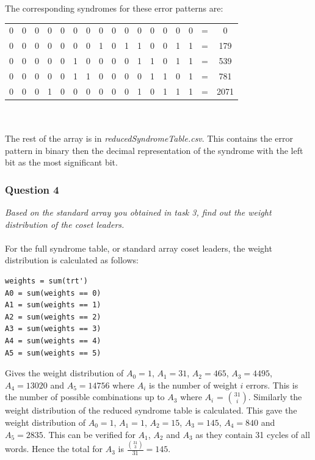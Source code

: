 \documentclass[a4paper]{article}
\begin{document}
The corresponding syndromes for these error patterns are:\\
\begin{tabular}{| *{15}{c} | c c |}
\hline
0 & 0 & 0 & 0 & 0 & 0 & 0 & 0 & 0 & 0 & 0 & 0 & 0 & 0 & 0 & = & 0 \\ 
0 & 0 & 0 & 0 & 0 & 0 & 0 & 1 & 0 & 1 & 1 & 0 & 0 & 1 & 1 & = & 179\\
0 & 0 & 0 & 0 & 0 & 1 & 0 & 0 & 0 & 0 & 1 & 1 & 0 & 1 & 1 & = & 539\\
0 & 0 & 0 & 0 & 0 & 1 & 1 & 0 & 0 & 0 & 0 & 1 & 1 & 0 & 1 & = & 781\\
0 & 0 & 0 & 1 & 0 & 0 & 0 & 0 & 0 & 0 & 1 & 0 & 1 & 1 & 1 & = & 2071\\
\hline
\end{tabular}\\
\\
The rest of the array is in \textit{reducedSyndromeTable.csv}. This contains the error pattern in binary then the decimal representation of the syndrome with the left bit as the most significant bit.

\subsubsection{Question 4} \textit{Based on the standard array you obtained in task 3, find out the weight distribution of the coset leaders.}\\
\\
For the full syndrome table, or standard array coset leaders, the weight distribution is calculated as follows:
\begin{lstlisting}
weights = sum(trt')
A0 = sum(weights == 0)
A1 = sum(weights == 1)
A2 = sum(weights == 2)
A3 = sum(weights == 3)
A4 = sum(weights == 4)
A5 = sum(weights == 5)
\end{lstlisting}
Gives the weight distribution of $A_0 = 1$, $A_1 = 31$, $A_2 = 465$, $A_3 = 4495$, $A_4 = 13020$ and $A_5 = 14756$ where $A_i$ is the number of weight $i$ errors. This is the number of possible combinations up to $A_3$ where $A_i$ = $ 31 \choose i$. Similarly the weight distribution of the reduced syndrome table is calculated. This gave the weight distribution of $A_0 = 1$, $A_1 = 1$, $A_2 = 15$, $A_3 = 145$, $A_4 = 840$ and $A_5 = 2835$. This can be verified for $A_1$, $A_2$ and $A_3$ as they contain 31 cycles of all words. Hence the total for $A_3$ is $ \frac{{31 \choose 3}}{31} = 145$.
\end{document}
